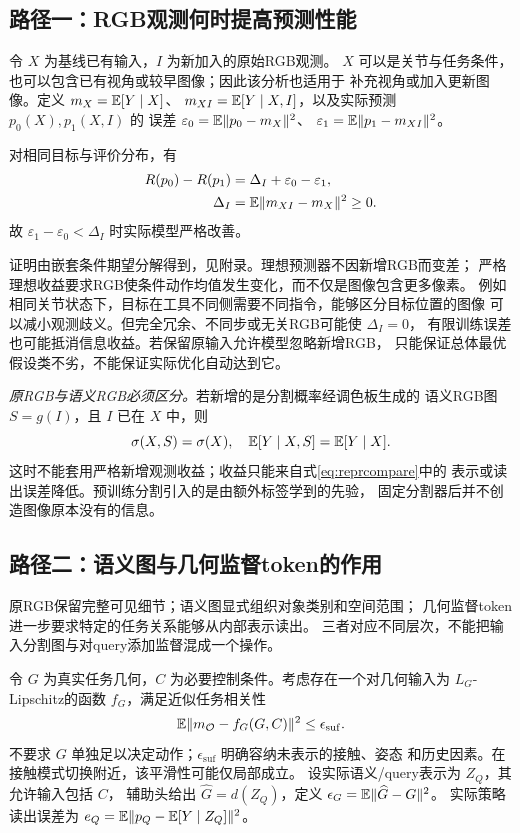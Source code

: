 \subsection{路径一：RGB观测何时提高预测性能}
令 $X$ 为基线已有输入，$I$ 为新加入的原始RGB观测。
$X$ 可以是关节与任务条件，也可以包含已有视角或较早图像；因此该分析也适用于
补充视角或加入更新图像。定义 $m_X=\mathbb E[Y\mid X]$、
$m_{XI}=\mathbb E[Y\mid X,I]$，以及实际预测 $p_0(X),p_1(X,I)$ 的
误差 $\varepsilon_0=\mathbb E\lVert p_0-m_X\rVert^2$、
$\varepsilon_1=\mathbb E\lVert p_1-m_{XI}\rVert^2$。
\begin{proposition}[新增RGB的实际改进条件]
\label{prop:rgb}
对相同目标与评价分布，有
\begin{align}
 R(p_0)-R(p_1)
 &=\Delta_I+\varepsilon_0-\varepsilon_1,\nonumber\\
 \Delta_I&=\mathbb E\lVert m_{XI}-m_X\rVert^2\geq0.
 \label{eq:rgbbenefit}
\end{align}
故 $\varepsilon_1-\varepsilon_0<\Delta_I$ 时实际模型严格改善。
\end{proposition}
证明由嵌套条件期望分解得到，见附录。理想预测器不因新增RGB而变差；
严格理想收益要求RGB使条件动作均值发生变化，而不仅是图像包含更多像素。
例如相同关节状态下，目标在工具不同侧需要不同指令，能够区分目标位置的图像
可以减小观测歧义。但完全冗余、不同步或无关RGB可能使 $\Delta_I=0$，
有限训练误差也可能抵消信息收益。若保留原输入允许模型忽略新增RGB，
只能保证总体最优假设类不劣，不能保证实际优化自动达到它。

\emph{原RGB与语义RGB必须区分。}若新增的是分割概率经调色板生成的
语义RGB图 $S=g(I)$，且 $I$ 已在 $X$ 中，则
\begin{equation}
 \sigma(X,S)=\sigma(X),\quad \mathbb E[Y\mid X,S]=\mathbb E[Y\mid X].
 \label{eq:noinfo}
\end{equation}
这时不能套用严格新增观测收益；收益只能来自式\eqref{eq:reprcompare}中的
表示或读出误差降低。预训练分割引入的是由额外标签学到的先验，
固定分割器后并不创造图像原本没有的信息。

\subsection{路径二：语义图与几何监督token的作用}
原RGB保留完整可见细节；语义图显式组织对象类别和空间范围；
几何监督token进一步要求特定的任务关系能够从内部表示读出。
三者对应不同层次，不能把输入分割图与对query添加监督混成一个操作。

令 $G$ 为真实任务几何，$C$ 为必要控制条件。考虑存在一个对几何输入为
$L_G$-Lipschitz的函数 $f_G$，满足近似任务相关性
\begin{equation}
 \mathbb E\lVert m_{\mathcal O}-f_G(G,C)\rVert^2\leq\epsilon_{\mathrm{suf}}.
 \label{eq:geoerrors}
\end{equation}
不要求 $G$ 单独足以决定动作；$\epsilon_{\mathrm{suf}}$ 明确容纳未表示的接触、姿态
和历史因素。在接触模式切换附近，该平滑性可能仅局部成立。
设实际语义/query表示为 $Z_Q$，其允许输入包括 $C$，
辅助头给出 $\widehat G=d(Z_Q)$，定义
$\epsilon_G=\mathbb E\lVert\widehat G-G\rVert^2$。
实际策略读出误差为 $e_Q=\mathbb E\lVert p_Q-\mathbb E[Y\mid Z_Q]\rVert^2$。


